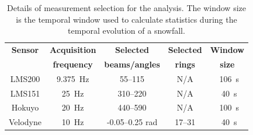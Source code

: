 \begin{table}[htbp]
    \centering
    \begin{tabular}{|c|c|c|c|c|}
        \hline
        \textbf{Sensor}            & \textbf{Acquisition}  & \textbf{Selected}  & \textbf{Selected}  & \textbf{Window} \\
        \textbf{ }                     & \textbf{frequency}  & \textbf{beams/angles}  & \textbf{rings}  & \textbf{size} \\\hline
        LMS200               & \SI{9.375}{\Hz}                      & 55--115                                    & N/A                         & ~\SI{106}{\second}       \\\hline
        LMS151               & \SI{25}{\Hz}                           & 310--220                                  & N/A                         & ~\SI{40}{\second}        \\\hline
        Hokuyo               & \SI{20}{\Hz}                          & 440--590                                  & N/A                         & ~\SI{100}{\second}     \\\hline
        Velodyne             & \SI{10}{\Hz}                          & -0.05--0.25 rad                     & 17--31                   & ~\SI{40}{\second}      \\\hline
    \end{tabular}
    \caption{Details of measurement selection for the analysis. The window size is the temporal window used to calculate statistics during the temporal evolution of a snowfall.}
    \label{tab:selectionScans}
\end{table}

